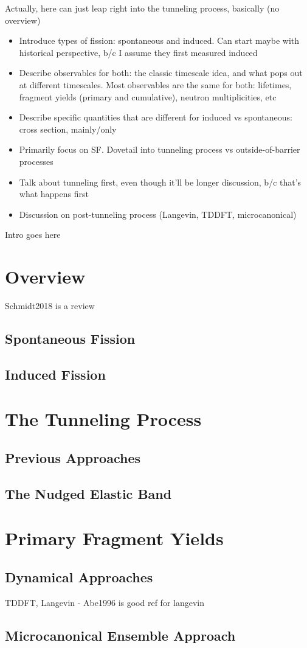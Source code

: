 \documentclass[../thesis.tex]{subfiles}
\begin{document}
\vspace{-1\baselineskip}

Actually, here can just leap right into the tunneling process, basically (no overview)
\begin{itemize}
	\item Introduce types of fission: spontaneous and induced. Can start maybe with historical perspective, b/c I assume they first measured induced
	\item Describe observables for both: the classic timescale idea, and what pops out at different timescales. Most observables are the same for both: lifetimes, fragment yields (primary and cumulative), neutron multiplicities, etc
	\item Describe specific quantities that are different for induced vs spontaneous: cross section, mainly/only
	\item Primarily focus on SF. Dovetail into tunneling process vs outside-of-barrier processes
	\item Talk about tunneling first, even though it'll be longer discussion, b/c that's what happens first
	\item Discussion on post-tunneling process (Langevin, TDDFT, microcanonical)
\end{itemize}

Intro goes here

\section{Overview}
Schmidt2018 is a review

\subsection{Spontaneous Fission}

\subsection{Induced Fission}

\section{The Tunneling Process}

\subsection{Previous Approaches}

\subsection{The Nudged Elastic Band}

\section{Primary Fragment Yields}

\subsection{Dynamical Approaches}
TDDFT, Langevin - Abe1996 is good ref for langevin

\subsection{Microcanonical Ensemble Approach}
\end{document}
